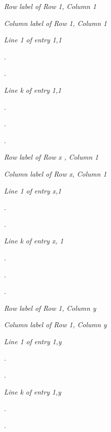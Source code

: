 \documentclass[12pt]{article}
\begin{document}
\textit{{\footnotesize{}                Row label of Row 1, Column 1}}

\textit{{\footnotesize{}                Column label of Row 1, Column 1}}

\textit{{\footnotesize{}                Line 1 of entry 1,1             }}

\textit{{\footnotesize{}                        .}}

\textit{{\footnotesize{}                        .}}

\textit{{\footnotesize{}                Line k of entry 1,1}}

\textit{{\footnotesize{}                        .}}

\textit{{\footnotesize{}                        .}}

\textit{{\footnotesize{}                        .}}

\textit{{\footnotesize{}                Row label of  Row  x , Column 1}}

\textit{{\footnotesize{}                Column label of Row x, Column 1}}

\textit{{\footnotesize{}                Line 1 of entry x,1}}

\textit{{\footnotesize{}                        .}}

\textit{{\footnotesize{}                        .}}

\textit{{\footnotesize{}                Line k of entry x, 1}}

\textit{{\footnotesize{}                        .}}

\textit{{\footnotesize{}                        .}}

\textit{{\footnotesize{}                        .}}

\textit{{\footnotesize{}                Row label of Row 1, Column y}}

\textit{{\footnotesize{}                Column label of Row 1, Column y}}

\textit{{\footnotesize{}                Line 1 of entry 1,y}}

\textit{{\footnotesize{}                        .}}

\textit{{\footnotesize{}                        .}}

\textit{{\footnotesize{}                Line k of entry 1,y}}

\textit{{\footnotesize{}                        .}}

\textit{{\footnotesize{}                        .}}
\end{document}
